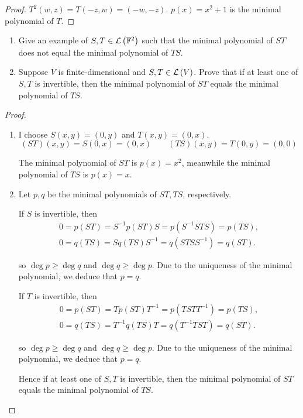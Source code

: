 \begin{proof}
    $T^{2}(w, z) = T(-z, w) = (-w, -z)$. $p(x) = x^{2} + 1$ is the minimal polynomial of $T$.
\end{proof}
\newpage

\begin{exercise}
    \begin{enumerate}[label={(\alph*)}]
        \item Give an example of $S, T\in\mathcal{L}\left({\mathbb{F}^{2}}\right)$ such that the minimal polynomial of $ST$ does not equal the minimal polynomial of $TS$.
        \item Suppose $V$ is finite-dimensional and $S,T \in \mathcal{L}\left({V}\right)$. Prove that if at least one of $S, T$ is invertible, then the minimal polynomial of $ST$ equals the minimal polynomial of $TS$.
    \end{enumerate}
\end{exercise}

\begin{proof}
    \begin{enumerate}[label={(\alph*)}]
        \item I choose $S(x, y) = (0, y)$ and $T(x, y) = (0, x)$.
              \[
                  (ST)(x, y) = S(0, x) = (0, x)\qquad (TS)(x, y) = T(0, y) = (0, 0)
              \]

              The minimal polynomial of $ST$ is $p(x) = x^{2}$, meanwhile the minimal polynomial of $TS$ is $p(x) = x$.
        \item Let $p, q$ be the minimal polynomials of $ST, TS$, respectively.

              If $S$ is invertible, then
              \[
                  \begin{split}
                      0 = p(ST) = S^{-1}p(ST)S = p(S^{-1}STS) = p(TS), \\
                      0 = q(TS) = Sq(TS)S^{-1} = q(STSS^{-1}) = q(ST).
                  \end{split}
              \]

              so $\deg p\geq \deg q$ and $\deg q\geq \deg p$. Due to the uniqueness of the minimal polynomial, we deduce that $p = q$.

              If $T$ is invertible, then
              \[
                  \begin{split}
                      0 = p(ST) = Tp(ST)T^{-1} = p(TSTT^{-1}) = p(TS), \\
                      0 = q(TS) = T^{-1}q(TS)T = q(T^{-1}TST) = q(ST).
                  \end{split}
              \]

              so $\deg p\geq \deg q$ and $\deg q\geq \deg p$. Due to the uniqueness of the minimal polynomial, we deduce that $p = q$.

              Hence if at least one of $S, T$ is invertible, then the minimal polynomial of $ST$ equals the minimal polynomial of $TS$.
    \end{enumerate}
\end{proof}
\newpage

